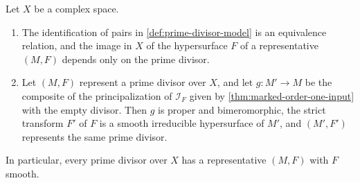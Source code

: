 \begin{lemma}\label{lem:prime-divisor-well-defined}
Let $X$ be a complex space.
\begin{enumerate}
\item The identification of pairs in \cref{def:prime-divisor-model} is an equivalence relation, and the image in $X$ of the hypersurface $F$ of a representative $(M,F)$ depends only on the prime divisor.
\item Let $(M,F)$ represent a prime divisor over $X$, and let $g\colon M'\to M$ be the composite of the principalization of $\mathcal I_F$ given by \cref{thm:marked-order-one-input} with the empty divisor. Then $g$ is proper and bimeromorphic, the strict transform $F'$ of $F$ is a smooth irreducible hypersurface of $M'$, and $(M',F')$ represents the same prime divisor.
\end{enumerate}
In particular, every prime divisor over $X$ has a representative $(M,F)$ with $F$ smooth.
\end{lemma}
